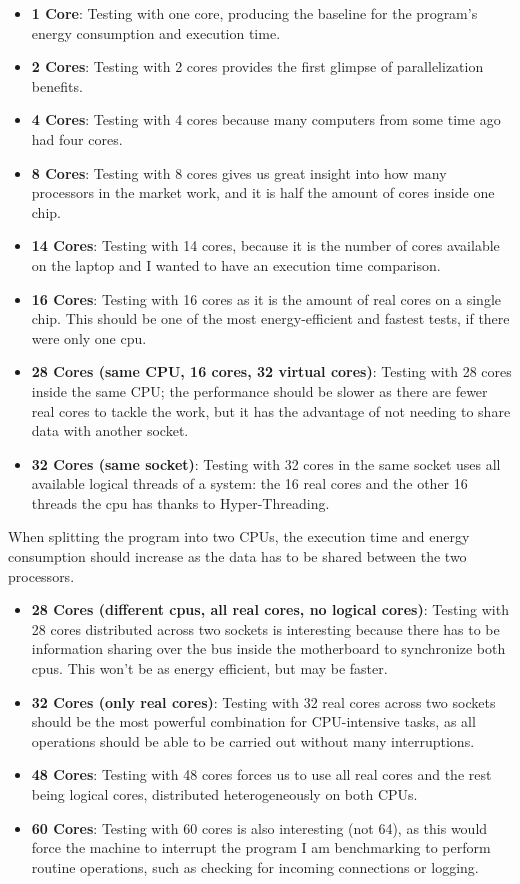 \begin{itemize}
    \item \textbf{1 Core}: Testing with one core, producing the baseline for the program's energy consumption and execution time.
    \item \textbf{2 Cores}: Testing with 2 cores provides the first glimpse of parallelization benefits.
    \item \textbf{4 Cores}: Testing with 4 cores because many computers from some time ago had four cores.
    \item \textbf{8 Cores}: Testing with 8 cores gives us great insight into how many processors in the market work, and it is half the amount of cores inside one chip.
    \item \textbf{14 Cores}: Testing with 14 cores, because it is the number of cores available on the laptop and I wanted to have an execution time comparison.
    \item \textbf{16 Cores}: Testing with 16 cores as it is the amount of real cores on a single chip. This should be one of the most energy-efficient and fastest tests, if there were only one \gls{cpu}.
    \item \textbf{28 Cores (same CPU, 16 cores, 32 virtual cores)}: Testing with 28 cores inside the same CPU; the performance should be slower as there are fewer real cores to tackle the work, but it has the advantage of not needing to share data with another socket.
    \item \textbf{32 Cores (same socket)}: Testing with 32 cores in the same socket uses all available logical threads of a system: the 16 real cores and the other 16 threads the \gls{cpu} has thanks to Hyper-Threading.
\end{itemize}

When splitting the program into two CPUs, the execution time and energy consumption should increase as the data has to be shared between the two processors.

\begin{itemize}
    \item \textbf{28 Cores (different \glspl{cpu}, all real cores, no logical cores)}: Testing with 28 cores distributed across two sockets is interesting because there has to be information sharing over the bus inside the motherboard to synchronize both \glspl{cpu}. This won't be as energy efficient, but may be faster.
    \item \textbf{32 Cores (only real cores)}: Testing with 32 real cores across two sockets should be the most powerful combination for CPU-intensive tasks, as all operations should be able to be carried out without many interruptions.
    \item \textbf{48 Cores}: Testing with 48 cores forces us to use all real cores and the rest being logical cores, distributed heterogeneously on both CPUs.
    \item \textbf{60 Cores}: Testing with 60 cores is also interesting (not 64), as this would force the machine to interrupt the program I am benchmarking to perform routine operations, such as checking for incoming connections or logging.
\end{itemize}

